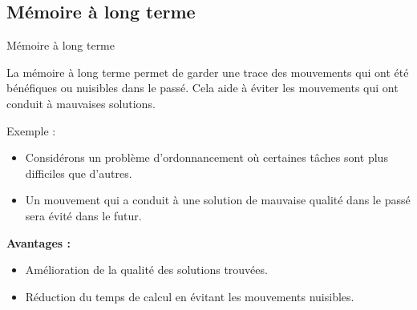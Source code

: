 \documentclass{beamer}
\begin{document}
\subsection{Mémoire à long terme}
\begin{frame}{Mémoire à long terme}
    \begin{definition}
        La mémoire à long terme permet de garder une trace des mouvements qui ont été bénéfiques ou nuisibles dans le passé. Cela aide à éviter les mouvements qui ont conduit à mauvaises solutions.
    \end{definition}
    \bigskip

    \begin{exampleblock}{Exemple :}
        \begin{itemize}
            \item Considérons un problème d'ordonnancement où certaines tâches sont plus
                  difficiles que d'autres.
            \item Un mouvement qui a conduit à une solution de mauvaise qualité dans le passé
                  sera évité dans le futur.
        \end{itemize}
    \end{exampleblock}
    \bigskip
    \textbf{Avantages :}
    \begin{itemize}
        \item Amélioration de la qualité des solutions trouvées.
        \item Réduction du temps de calcul en évitant les mouvements nuisibles.
    \end{itemize}
\end{frame}
\end{document}
